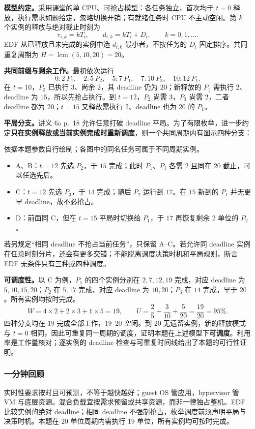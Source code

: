 \begin{checkedsolution}
\nopagebreak[4]
\textbf{模型约定。}采用课堂的单 CPU、可抢占模型：各任务独立、首次均于 $t=0$ 释放，执行需求如题给定，忽略切换开销；有就绪任务时 CPU 不主动空闲。第 $k$ 个实例的释放与绝对截止时刻为
\[
  r_{i,k}=kT_i,\qquad d_{i,k}=kT_i+D_i,\qquad k=0,1,\ldots.
\]
EDF 从已释放且未完成的实例中选 $d_{i,k}$ 最小者，不按任务的 $D_i$ 固定排序。共同重复周期为 $H=\operatorname{lcm}(5,10,20)=20$。

\textbf{共同前缀与剩余工作。}最初依次运行
\[
  0\!:\!2\ P_1,\quad 2\!:\!5\ P_2,\quad 5\!:\!7\ P_1,\quad
  7\!:\!10\ P_3,\quad 10\!:\!12\ P_1.
\]
在 $t=10$，$P_3$ 已执行 $3$、尚余 $2$，其 deadline 仍为 $20$；新释放的 $P_1$ 需执行 $2$、deadline 为 $15$，所以先抢占执行。到 $t=12$，$P_2$ 尚需 $3$，$P_3$ 尚需 $2$，二者 deadline 都为 $20$；$t=15$ 又释放需执行 $2$、deadline 也为 $20$ 的 $P_1$。

\textbf{平局分支。}讲义 6a p.~18 允许任意打破 deadline 平局。为了有限枚举，进一步约定\textbf{只在实例释放或当前实例完成时重新调度}，则一个共同周期内有图示四种分支：
\begin{center}
  
  \par\small 依据本题参数自行绘制；各图中的同名任务可属于不同周期实例。
\end{center}

\begin{itemize}
  \item A、B：$t=12$ 先选 $P_2$，于 $15$ 完成；此时 $P_1$、$P_3$ 各需 $2$ 且同在 $20$ 截止，可以任选先后。
  \item C：$t=12$ 先选 $P_3$，于 $14$ 完成；随后 $P_2$ 运行到 $17$。在 $15$ 新到的 $P_1$ 并无更早 deadline，故不必抢占。
  \item D：前面同 C，但在 $t=15$ 平局时切换给 $P_1$，于 $17$ 再恢复剩余 $2$ 单位的 $P_2$。
\end{itemize}
若另规定“相同 deadline 不抢占当前任务”，只保留 A--C。若允许同 deadline 实例在任意时刻分片，还会有更多交错；不能脱离调度决策时机和平局规则，断言 EDF 无条件只有三种或四种调度。

\textbf{可调度性。}以 C 为例，$P_1$ 的四个实例分别在 $2,7,12,19$ 完成，对应 deadline 为 $5,10,15,20$；$P_2$ 在 $5,17$ 完成，对应 deadline 为 $10,20$；$P_3$ 在 $14$ 完成，早于 $20$。所有实例均按时完成。
\[
  W=4\times2+2\times3+1\times5=19,\qquad
  U=\frac25+\frac3{10}+\frac5{20}=\frac{19}{20}=95\%.
\]
四种分支均在 $19$ 完成全部工作，$19$--$20$ 空闲。到 $20$ 无遗留实例，新的释放模式与 $t=0$ 相同，因此可重复同一周期的调度，证明本题在上述模型下\textbf{可调度}。利用率是工作量核对；逐实例的 deadline 检查与可重复时间线给出了本题的可行性证明。
\end{checkedsolution}

\subsubsection*{一分钟回顾}

实时性要求按时且可预测，不等于越快越好；guest OS 管应用，hypervisor 管 VM 与底层资源。混合负载宜按需求预留或共享资源，而非一律独占整机。EDF 比较实例的绝对 deadline；相同 deadline 不强制抢占，枚举调度前须声明平局与决策时机。本题在 $20$ 单位周期内需执行 $19$ 单位，所有实例均可按时完成。
